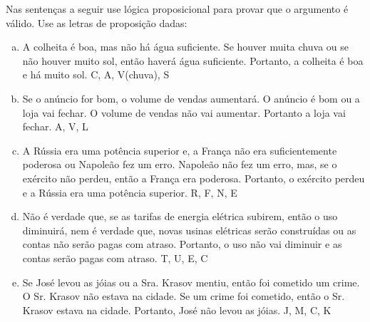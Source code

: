 \documentclass[a4paper, 12pt, addpoints]{exam}
\begin{document}
\begin{questions}
  \question Nas sentenças a seguir use lógica proposicional para provar que o argumento é
  válido. Use as letras de proposição dadas:

  \begin{enumerate}[a)]
    \item A colheita é boa, mas não há água suficiente. Se houver muita chuva ou se não
          houver muito sol, então haverá água suficiente. Portanto, a colheita é boa e há muito
          sol. C, A, V(chuva), S
    \item Se o anúncio for bom, o volume de vendas aumentará. O anúncio é bom ou a loja
          vai fechar. O volume de vendas não vai aumentar. Portanto a loja vai fechar. A, V, L
    \item A Rússia era uma potência superior e, a França não era suficientemente poderosa
          ou Napoleão fez um erro. Napoleão não fez um erro, mas, se o exército não perdeu,
          então a França era poderosa. Portanto, o exército perdeu e a Rússia era uma potência
          superior. R, F, N, E
    \item Não é verdade que, se as tarifas de energia elétrica subirem, então o uso diminuirá,
          nem é verdade que, novas usinas elétricas serão construídas ou as contas não serão
          pagas com atraso. Portanto, o uso não vai diminuir e as contas serão pagas com atraso.
          T, U, E, C
    \item Se José levou as jóias ou a Sra. Krasov mentiu, então foi cometido um crime. O Sr.
          Krasov não estava na cidade. Se um crime foi cometido, então o Sr. Krasov estava na
          cidade. Portanto, José não levou as jóias. J, M, C, K
  \end{enumerate}


\end{questions}
\end{document}
